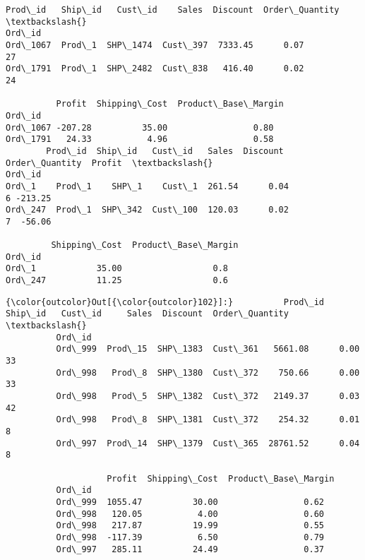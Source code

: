\documentclass[11pt]{article}
\begin{document}
    \begin{Verbatim}[commandchars=\\\{\}]
         Prod\_id   Ship\_id   Cust\_id    Sales  Discount  Order\_Quantity  \textbackslash{}
Ord\_id                                                                    
Ord\_1067  Prod\_1  SHP\_1474  Cust\_397  7333.45      0.07              27   
Ord\_1791  Prod\_1  SHP\_2482  Cust\_838   416.40      0.02              24   

          Profit  Shipping\_Cost  Product\_Base\_Margin  
Ord\_id                                                
Ord\_1067 -207.28          35.00                 0.80  
Ord\_1791   24.33           4.96                 0.58  
        Prod\_id  Ship\_id   Cust\_id   Sales  Discount  Order\_Quantity  Profit  \textbackslash{}
Ord\_id                                                                         
Ord\_1    Prod\_1    SHP\_1    Cust\_1  261.54      0.04               6 -213.25   
Ord\_247  Prod\_1  SHP\_342  Cust\_100  120.03      0.02               7  -56.06   

         Shipping\_Cost  Product\_Base\_Margin  
Ord\_id                                       
Ord\_1            35.00                  0.8  
Ord\_247          11.25                  0.6  

    \end{Verbatim}

\begin{Verbatim}[commandchars=\\\{\}]
{\color{outcolor}Out[{\color{outcolor}102}]:}          Prod\_id   Ship\_id   Cust\_id     Sales  Discount  Order\_Quantity  \textbackslash{}
          Ord\_id                                                                     
          Ord\_999  Prod\_15  SHP\_1383  Cust\_361   5661.08      0.00              33   
          Ord\_998   Prod\_8  SHP\_1380  Cust\_372    750.66      0.00              33   
          Ord\_998   Prod\_5  SHP\_1382  Cust\_372   2149.37      0.03              42   
          Ord\_998   Prod\_8  SHP\_1381  Cust\_372    254.32      0.01               8   
          Ord\_997  Prod\_14  SHP\_1379  Cust\_365  28761.52      0.04               8   
          
                    Profit  Shipping\_Cost  Product\_Base\_Margin  
          Ord\_id                                                
          Ord\_999  1055.47          30.00                 0.62  
          Ord\_998   120.05           4.00                 0.60  
          Ord\_998   217.87          19.99                 0.55  
          Ord\_998  -117.39           6.50                 0.79  
          Ord\_997   285.11          24.49                 0.37  
\end{Verbatim}
            
\end{document}
